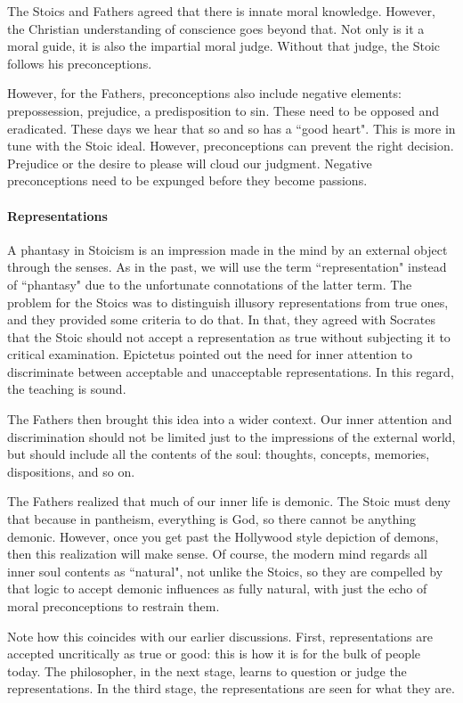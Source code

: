 The Stoics and Fathers agreed that there is innate moral knowledge. However, the Christian understanding of conscience goes beyond that. Not only is it a moral guide, it is also the impartial moral judge. Without that judge, the Stoic follows his preconceptions.

However, for the Fathers, preconceptions also include negative elements: prepossession, prejudice, a predisposition to sin. These need to be opposed and eradicated. These days we hear that so and so has a ``good heart". This is more in tune with the Stoic ideal. However, preconceptions can prevent the right decision. Prejudice or the desire to please will cloud our judgment. Negative preconceptions need to be expunged before they become passions.

\paragraph{Representations}
A phantasy in Stoicism is an impression made in the mind by an external object through the senses. As in the past, we will use the term ``representation" instead of ``phantasy" due to the unfortunate connotations of the latter term. The problem for the Stoics was to distinguish illusory representations from true ones, and they provided some criteria to do that. In that, they agreed with Socrates that the Stoic should not accept a representation as true without subjecting it to critical examination. Epictetus pointed out the need for inner attention to discriminate between acceptable and unacceptable representations. In this regard, the teaching is sound.

The Fathers then brought this idea into a wider context. Our inner attention and discrimination should not be limited just to the impressions of the external world, but should include all the contents of the soul: thoughts, concepts, memories, dispositions, and so on.

The Fathers realized that much of our inner life is demonic. The Stoic must deny that because in pantheism, everything is God, so there cannot be anything demonic. However, once you get past the Hollywood style depiction of demons, then this realization will make sense. Of course, the modern mind regards all inner soul contents as ``natural", not unlike the Stoics, so they are compelled by that logic to accept demonic influences as fully natural, with just the echo of moral preconceptions to restrain them.

Note how this coincides with our earlier discussions. First, representations are accepted uncritically as true or good: this is how it is for the bulk of people today. The philosopher, in the next stage, learns to question or judge the representations. In the third stage, the representations are seen for what they are.

